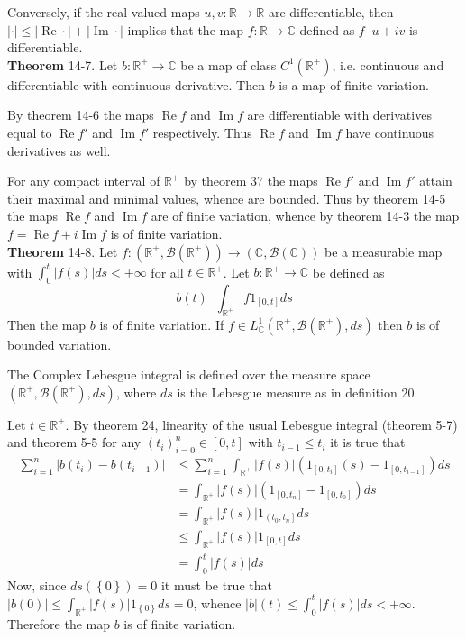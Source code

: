 \documentclass[a4paper]{article}
\newcommand{\obj}[1]{\left\{ #1 \right \}}
\newcommand{\clo}[1]{\left [ #1 \right ]}
\newcommand{\ploc}[1]{\left ( #1 \right ]}
\newcommand{\brac}[1]{\left ( #1 \right )}
\newcommand{\abs}[1]{\left | #1 \right |}
\newcommand{\Real}{\mathbb{R}}
\newcommand{\Cplx}{\mathbb{C}}
\newcommand{\borel}[1]{\mathcal{B}\brac{#1}}
\newcommand{\defn}{\mathop{\overset{\Delta}{=}}\nolimits}
\newcommand{\re}{\operatorname{Re}\nolimits}
\newcommand{\im}{\operatorname{Im}\nolimits}
\begin{document}
Conversely, if the real-valued maps $u,v:\Real\to\Real$ are differentiable, then $\abs{\cdot}\leq \abs{\re\cdot}+\abs{\im\cdot}$ implies that the map $f:\Real\to\Cplx$ defined as $f\defn u+iv$ is differentiable.\\

\label{thm:cplx_cont_diff_fin_var}\noindent\textbf{Theorem} 14-7.
Let $b:\Real^+\to\Cplx$ be a map of class $C^1\brac{\Real^+}$, i.e. continuous and differentiable with continuous derivative. Then $b$ is a map of finite variation.

By theorem 14-6 the maps $\re f$ and $\im f$ are differentiable with derivatives equal to $\re f'$ and $\im f'$ respectively. Thus $\re f$ and $\im f$ have continuous derivatives as well.

For any compact interval of $\Real^+$ by theorem 37 the maps $\re f'$ and $\im f'$ attain their maximal and minimal values, whence are bounded. Thus by theorem 14-5 the maps $\re f$ and $\im f$ are of finite variation, whence by theorem 14-3 the map $f=\re f + i \im f$ is of finite variation.\\

\label{thm:leb_integr_total_var}\noindent\textbf{Theorem} 14-8.
Let $f:\brac{\Real^+,\borel{\Real^+}}\to\brac{\Cplx,\borel{\Cplx}}$ be a measurable map with $\int_0^t \abs{f\brac{s}}ds <+\infty$ for all $t\in \Real^+$. Let $b:\Real^+\to\Cplx$ be defined as\[b\brac{t}\defn \int_{\Real^+} f 1_{\clo{0,t}} ds\] Then the map $b$ is of finite variation. If $f\in L^1_\Cplx\brac{\Real^+,\borel{\Real^+},ds}$ then $b$ is of bounded variation.

The Complex Lebesgue integral is defined over the measure space $\brac{\Real^+,\borel{\Real^+},ds}$, where $ds$ is the Lebesgue measure as in definition 20.

Let $t\in \Real^+$. By theorem 24, linearity of the usual Lebesgue integral (theorem 5-7) and theorem 5-5 for any $\brac{t_i}_{i=0}^n\in\clo{0,t}$ with $t_{i-1}\leq t_i$ it is true that \begin{align*}\sum_{i=1}^n \abs{b\brac{t_i}-b\brac{t_{i-1}}} &\leq \sum_{i=1}^n \int_{\Real^+} \abs{f\brac{s}} \brac{1_{\clo{0,t_i}}\brac{s} - 1_{\clo{0,t_{i-1}}}} ds \\ &= \int_{\Real^+} \abs{f\brac{s}} \brac{1_{\clo{0,t_n}} - 1_{\clo{0,t_0}}} ds \\ &= \int_{\Real^+} \abs{f\brac{s}} 1_{\ploc{t_0,t_n}} ds \\ &\leq \int_{\Real^+} \abs{f\brac{s}} 1_{\clo{0,t}} ds \\ &= \int_0^t \abs{f\brac{s}} ds\end{align*} Now, since $ds\brac{\obj{0}}=0$ it must be true that $\abs{b\brac{0}}\leq \int_{\Real^+} \abs{f\brac{s}} 1_{\obj{0}} ds = 0$, whence $\abs{b}\brac{t}\leq \int_0^t \abs{f\brac{s}} ds<+\infty$. Therefore the map $b$ is of finite variation.
\end{document}
